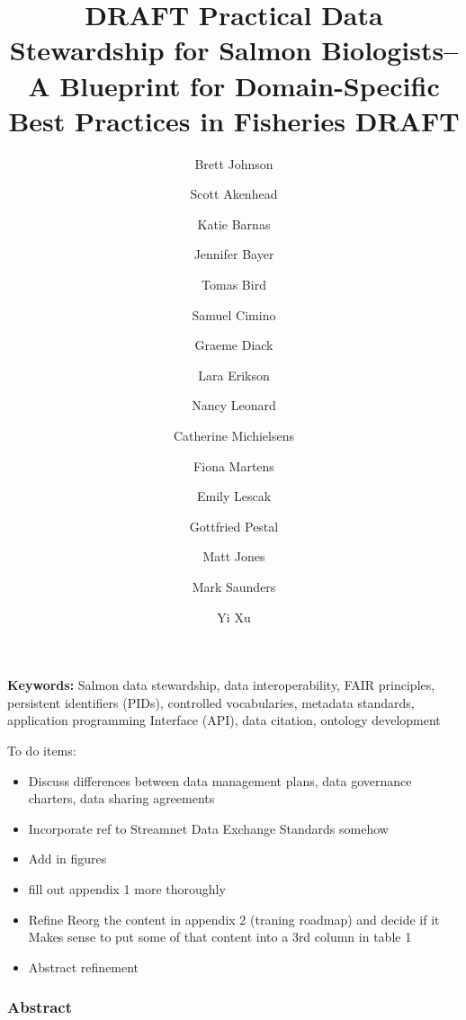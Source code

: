 \documentclass[
  letterpaper,
  DIV=11,
  numbers=noendperiod]{scrartcl}
\title{DRAFT Practical Data Stewardship for Salmon Biologists--A
Blueprint for Domain-Specific Best Practices in Fisheries DRAFT}
\author{Brett Johnson \and Scott Akenhead \and Katie
Barnas \and Jennifer Bayer \and Tomas Bird \and Samuel
Cimino \and Graeme Diack \and Lara Erikson \and Nancy
Leonard \and Catherine Michielsens \and Fiona Martens \and Emily
Lescak \and Gottfried Pestal \and Matt Jones \and Mark Saunders \and Yi
Xu}
\date{}
\providecommand{\tightlist}{%
  \setlength{\itemsep}{0pt}\setlength{\parskip}{0pt}}\usepackage{longtable,booktabs,array}
\begin{document}
\maketitle


\textbf{Keywords:} Salmon data stewardship, data interoperability, FAIR
principles, persistent identifiers (PIDs), controlled vocabularies,
metadata standards, application programming Interface (API), data
citation, ontology development

To do items:

\begin{itemize}
\tightlist
\item
  Discuss differences between data management plans, data governance
  charters, data sharing agreements
\item
  Incorporate ref to Streamnet Data Exchange Standards somehow
\item
  Add in figures
\item
  fill out appendix 1 more thoroughly
\item
  Refine Reorg the content in appendix 2 (traning roadmap) and decide if
  it Makes sense to put some of that content into a 3rd column in table
  1
\item
  Abstract refinement
\end{itemize}

\subsubsection{Abstract}\label{abstract}
\end{document}
